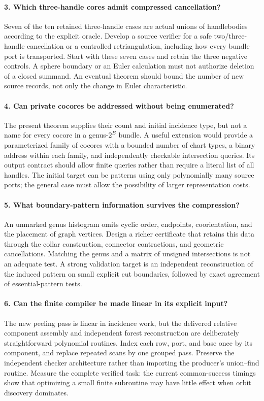 \paragraph{3. Which three-handle cores admit compressed cancellation?}
Seven of the ten retained three-handle cases are actual unions of
handlebodies according to the explicit oracle.  Develop a source verifier
for a safe two/three-handle cancellation or a controlled retriangulation,
including how every bundle port is transported.  Start with these seven
cases and retain the three negative controls.  A sphere boundary or an
Euler calculation must not authorize deletion of a closed summand.
An eventual theorem should bound the number of new source records, not
only the change in Euler characteristic.

\paragraph{4. Can private cocores be addressed without being enumerated?}
The present theorem supplies their count and initial incidence type, but
not a name for every cocore in a genus-$2^B$ bundle.  A useful extension
would provide a parameterized family of cocores with a bounded number of
chart types, a binary address within each family, and independently
checkable intersection queries.  Its output contract should allow finite
queries rather than require a literal list of all handles.  The initial
target can be patterns using only polynomially many source ports; the
general case must allow the possibility of larger representation costs.

\paragraph{5. What boundary-pattern information survives the compression?}
An unmarked genus histogram omits cyclic order, endpoints, coorientation,
and the placement of graph vertices.  Design a richer certificate that
retains this data through the collar construction, connector contractions,
and geometric cancellations.  Matching the genus and a matrix of unsigned
intersections is not an adequate test.  A strong validation target is an
independent reconstruction of the induced pattern on small explicit cut
boundaries, followed by exact agreement of essential-pattern tests.

\paragraph{6. Can the finite compiler be made linear in its explicit input?}
The new peeling pass is linear in incidence work, but the delivered
relative component assembly and independent forest reconstruction are
deliberately straightforward polynomial routines.  Index each row, port,
and base once by its component, and replace repeated scans by one grouped
pass.  Preserve the independent checker architecture rather than importing
the producer's union--find routine.  Measure the complete verified task:
the current common-success timings show that optimizing a small finite
subroutine may have little effect when orbit discovery dominates.

